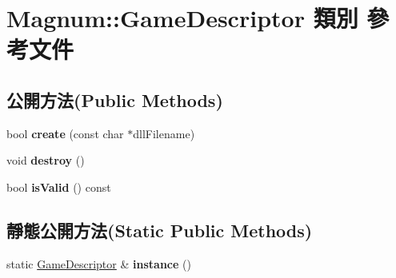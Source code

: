 \hypertarget{class_magnum_1_1_game_descriptor}{}\section{Magnum\+:\+:Game\+Descriptor 類別 參考文件}
\label{class_magnum_1_1_game_descriptor}
\subsection*{公開方法(Public Methods)}
\begin{DoxyCompactItemize}
\item 
bool {\bfseries create} (const char $\ast$dll\+Filename)\hypertarget{class_magnum_1_1_game_descriptor_ab4db357cbaf7c45d808a20bea9ae7d3f}{}\label{class_magnum_1_1_game_descriptor_ab4db357cbaf7c45d808a20bea9ae7d3f}

\item 
void {\bfseries destroy} ()\hypertarget{class_magnum_1_1_game_descriptor_aca3743d0c876e8cbd42d6a892694c7cd}{}\label{class_magnum_1_1_game_descriptor_aca3743d0c876e8cbd42d6a892694c7cd}

\item 
bool {\bfseries is\+Valid} () const \hypertarget{class_magnum_1_1_game_descriptor_a1d2cefc8a25aedda51f96cb943ec8a25}{}\label{class_magnum_1_1_game_descriptor_a1d2cefc8a25aedda51f96cb943ec8a25}

\end{DoxyCompactItemize}
\subsection*{靜態公開方法(Static Public Methods)}
\begin{DoxyCompactItemize}
\item 
static \hyperlink{class_magnum_1_1_game_descriptor}{Game\+Descriptor} \& {\bfseries instance} ()\hypertarget{class_magnum_1_1_game_descriptor_a44fc91aa03a9684659b0051372c4ff16}{}\label{class_magnum_1_1_game_descriptor_a44fc91aa03a9684659b0051372c4ff16}

\end{DoxyCompactItemize}
